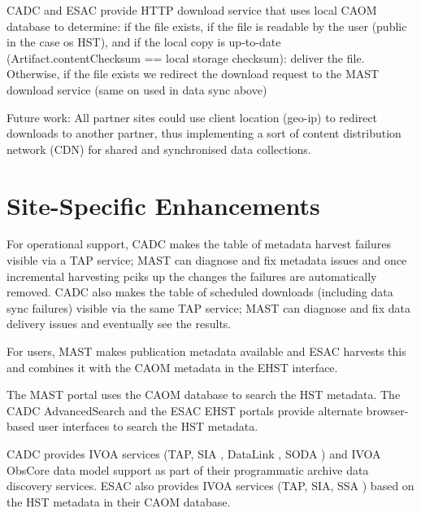\documentclass[11pt,twoside]{article}
\begin{document}
CADC and ESAC provide HTTP download service that uses local CAOM database to determine: if the file exists, if the file is readable by the user (public in the case os HST), and if the local copy is up-to-date (Artifact.contentChecksum == local storage checksum): deliver the file. Otherwise, if the file exists we redirect the download request to the MAST download service (same on used in data sync above)

Future work: All partner sites could use client location (geo-ip) to redirect downloads to another partner, thus implementing a sort of content distribution network (CDN) for shared and synchronised data collections.

\section{Site-Specific Enhancements}

For operational support, CADC makes the table of metadata harvest failures visible via a TAP \citep{std:TAP} service; MAST can diagnose and fix metadata issues and once incremental harvesting pciks up the changes the failures are automatically removed. CADC also makes the table of scheduled downloads (including data sync failures) visible via the same TAP service; MAST can diagnose and fix data delivery issues and eventually see the results.

For users, MAST makes publication metadata available and ESAC harvests this and combines it with the CAOM metadata in the EHST interface. 

The MAST portal uses the CAOM database to search the HST metadata. The CADC AdvancedSearch and the ESAC EHST portals provide alternate browser-based user interfaces to search the HST metadata. 

CADC provides IVOA services (TAP, SIA \citep{std:SIA}, DataLink \citep{std:DataLink}, SODA \citep{std:SODA}) and IVOA ObsCore data model support as part of their programmatic archive data discovery services. ESAC also provides IVOA services (TAP, SIA, SSA \citep{std:SSA}) based on the HST metadata in their CAOM database.


\end{document}
